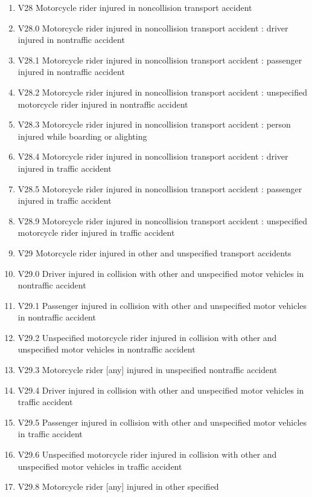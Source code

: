 \documentclass[
]{scrartcl}
\begin{document}
\begin{itemize}
\begin{enumerate}
  \item
    V28 Motorcycle rider injured in noncollision transport accident
  \item
    V28.0 Motorcycle rider injured in noncollision transport accident :
    driver injured in nontraffic accident
  \item
    V28.1 Motorcycle rider injured in noncollision transport accident :
    passenger injured in nontraffic accident
  \item
    V28.2 Motorcycle rider injured in noncollision transport accident :
    unspecified motorcycle rider injured in nontraffic accident
  \item
    V28.3 Motorcycle rider injured in noncollision transport accident :
    person injured while boarding or alighting
  \item
    V28.4 Motorcycle rider injured in noncollision transport accident :
    driver injured in traffic accident
  \item
    V28.5 Motorcycle rider injured in noncollision transport accident :
    passenger injured in traffic accident
  \item
    V28.9 Motorcycle rider injured in noncollision transport accident :
    unspecified motorcycle rider injured in traffic accident
  \item
    V29 Motorcycle rider injured in other and unspecified transport
    accidents
  \item
    V29.0 Driver injured in collision with other and unspecified motor
    vehicles in nontraffic accident
  \item
    V29.1 Passenger injured in collision with other and unspecified
    motor vehicles in nontraffic accident
  \item
    V29.2 Unspecified motorcycle rider injured in collision with other
    and unspecified motor vehicles in nontraffic accident
  \item
    V29.3 Motorcycle rider {[}any{]} injured in unspecified nontraffic
    accident
  \item
    V29.4 Driver injured in collision with other and unspecified motor
    vehicles in traffic accident
  \item
    V29.5 Passenger injured in collision with other and unspecified
    motor vehicles in traffic accident
  \item
    V29.6 Unspecified motorcycle rider injured in collision with other
    and unspecified motor vehicles in traffic accident
  \item
    V29.8 Motorcycle rider {[}any{]} injured in other specified

\end{enumerate}
\end{itemize}
\end{document}
